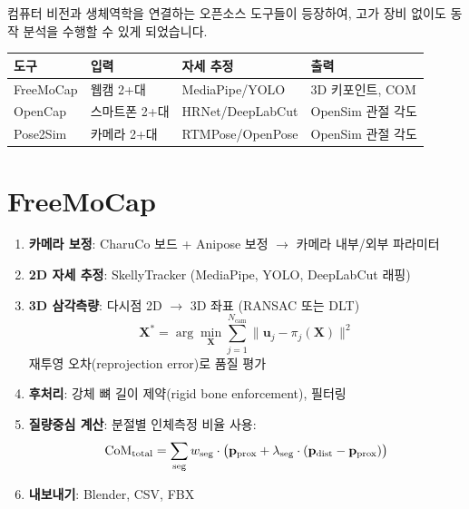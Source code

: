 \documentclass[11pt, a4paper]{report}
\begin{document}
컴퓨터 비전과 생체역학을 연결하는 오픈소스 도구들이 등장하여, 고가 장비 없이도 동작 분석을 수행할 수 있게 되었습니다.

\begin{center}
\renewcommand{\arraystretch}{1.3}
\begin{tabular}{p{2.5cm}p{3cm}p{3.5cm}p{3.5cm}}
\toprule
\textbf{도구} & \textbf{입력} & \textbf{자세 추정} & \textbf{출력} \\
\midrule
FreeMoCap & 웹캠 2+대 & MediaPipe/YOLO & 3D 키포인트, COM \\
OpenCap & 스마트폰 2+대 & HRNet/DeepLabCut & OpenSim 관절 각도 \\
Pose2Sim & 카메라 2+대 & RTMPose/OpenPose & OpenSim 관절 각도 \\
\bottomrule
\end{tabular}
\end{center}


\section{FreeMoCap}

\begin{cvbox}[title={FreeMoCap 파이프라인}]
\begin{enumerate}[leftmargin=*]
  \item \textbf{카메라 보정}: CharuCo 보드 + Anipose 보정 $\rightarrow$ 카메라 내부/외부 파라미터
  \item \textbf{2D 자세 추정}: SkellyTracker (MediaPipe, YOLO, DeepLabCut 래핑)
  \item \textbf{3D 삼각측량}: 다시점 2D $\rightarrow$ 3D 좌표 (RANSAC 또는 DLT)
  \begin{equation}
    \mathbf{X}^* = \arg\min_{\mathbf{X}} \sum_{j=1}^{N_{\text{cam}}} \| \mathbf{u}_j - \pi_j(\mathbf{X}) \|^2
  \end{equation}
  재투영 오차(reprojection error)로 품질 평가
  \item \textbf{후처리}: 강체 뼈 길이 제약(rigid bone enforcement), 필터링
  \item \textbf{질량중심 계산}: 분절별 인체측정 비율 사용:
  \begin{equation}
    \text{CoM}_{\text{total}} = \sum_{\text{seg}} w_{\text{seg}} \cdot \big( \mathbf{p}_{\text{prox}} + \lambda_{\text{seg}} \cdot (\mathbf{p}_{\text{dist}} - \mathbf{p}_{\text{prox}}) \big)
  \end{equation}
  \item \textbf{내보내기}: Blender, CSV, FBX
\end{enumerate}
\end{cvbox}
\end{document}
